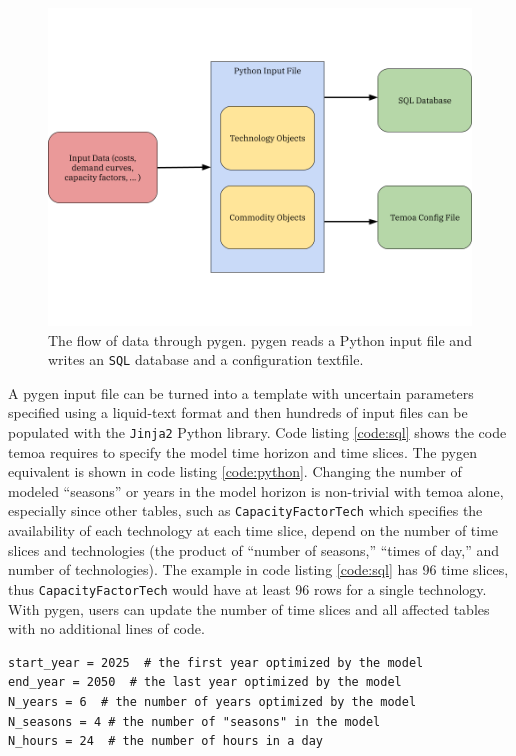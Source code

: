 \begin{figure}[H]
  \centering
  \includegraphics[width=0.8\columnwidth]{figures/pygen-outline.png}
  \caption{The flow of data through \gls{pygen}. \gls{pygen} reads a Python
  input file and writes an \texttt{SQL} database and a configuration textfile.}
  \label{fig:pygen-flow}
\end{figure}
A \gls{pygen} input file can be turned into a template with uncertain parameters
specified using a liquid-text format and then hundreds of input files can be
populated with the \texttt{Jinja2} Python library. Code listing \ref{code:sql} shows
the code \gls{temoa} requires to specify the model time horizon and time slices.
The \gls{pygen} equivalent is shown in code listing \ref{code:python}. Changing
the number of modeled ``seasons'' or years in the model horizon is non-trivial with
\gls{temoa} alone, especially since other tables, such as \texttt{CapacityFactorTech}
which specifies the availability of each technology at each time slice, depend
on the number of time slices and technologies (the product of ``number of seasons,''
``times of day,'' and number of technologies).
The example in code listing \ref{code:sql} has 96 time slices, thus \texttt{CapacityFactorTech}
would have at least 96 rows for a single technology. With \gls{pygen}, users can
update the number of time slices and all affected tables with no additional lines
of code.



\begin{lstlisting}[style=pythonstyle, caption={Equivalent \gls{pygen} code to specify the model horizon and time slices.}, label={code:python}, floatplacement=H]
start_year = 2025  # the first year optimized by the model
end_year = 2050  # the last year optimized by the model
N_years = 6  # the number of years optimized by the model
N_seasons = 4 # the number of "seasons" in the model
N_hours = 24  # the number of hours in a day
\end{lstlisting}




